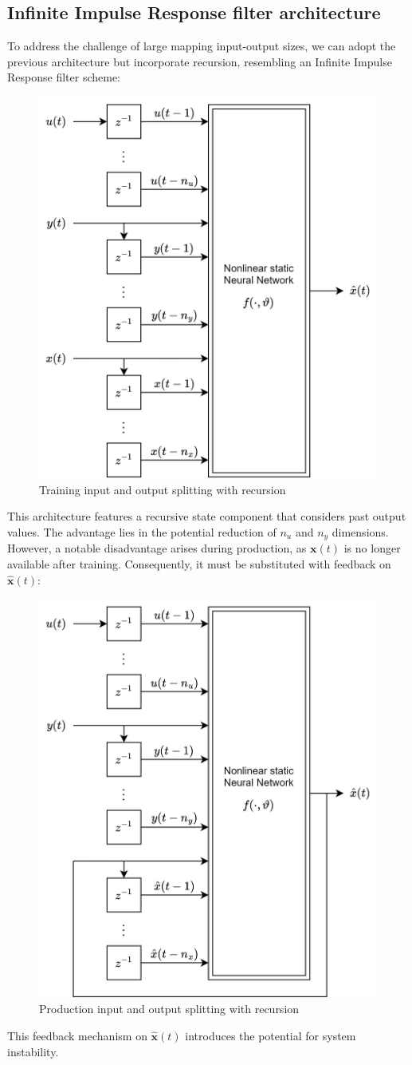 \subsection{Infinite Impulse Response filter architecture}
To address the challenge of large mapping input-output sizes, we can adopt the previous architecture but incorporate recursion, resembling an Infinite Impulse Response filter scheme:
\begin{figure}[H]
    \centering
    \includegraphics[width=0.4\linewidth]{images/split1.png}
    \caption{Training input and output splitting with recursion}
\end{figure}
\noindent This architecture features a recursive state component that considers past output values.
The advantage lies in the potential reduction of $n_u$ and $n_y$ dimensions.
However, a notable disadvantage arises during production, as $\mathbf{x}(t)$ is no longer available after training. 
Consequently, it must be substituted with feedback on $\hat{\mathbf{x}}(t)$:
\begin{figure}[H]
    \centering
    \includegraphics[width=0.4\linewidth]{images/split2.png}
    \caption{Production input and output splitting with recursion}
\end{figure}
\noindent This feedback mechanism on $\hat{\mathbf{x}}(t)$  introduces the potential for system instability.

